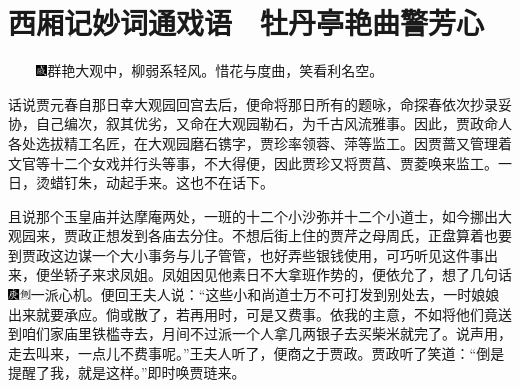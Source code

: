

\chapter{西厢记妙词通戏语　牡丹亭艳曲警芳心}
{　　\includegraphics[width=3mm]{../Images/00005}群艳大观中，柳弱系轻风。惜花与度曲，笑看利名空。}

话说贾元春自那日幸大观园回宫去后，便命将那日所有的题咏，命探春依次抄录妥协，自己编次，叙其优劣，又命在大观园勒石，为千古风流雅事。因此，贾政命人各处选拔精工名匠，在大观园磨石镌字，贾珍率领蓉、萍等监工。因贾蔷又管理着文官等十二个女戏并行头等事，不大得便，因此贾珍又将贾菖、贾菱唤来监工。一日，烫蜡钉朱，动起手来。这也不在话下。

且说那个玉皇庙并达摩庵两处，一班的十二个小沙弥并十二个小道士，如今挪出大观园来，贾政正想发到各庙去分住。不想后街上住的贾芹之母周氏，正盘算着也要到贾政这边谋一个大小事务与儿子管管，也好弄些银钱使用，可巧听见这件事出来，便坐轿子来求凤姐。凤姐因见他素日不大拿班作势的，便依允了，想了几句话{\includegraphics[width=3mm]{../Images/00004}\includegraphics[width=3mm]{../Images/00011}\footnotesize \kaishu 一派心机。}便回王夫人说：``这些小和尚道士万不可打发到别处去，一时娘娘出来就要承应。倘或散了，若再用时，可是又费事。依我的主意，不如将他们竟送到咱们家庙里铁槛寺去，月间不过派一个人拿几两银子去买柴米就完了。说声用，走去叫来，一点儿不费事呢。''王夫人听了，便商之于贾政。贾政听了笑道：``倒是提醒了我，就是这样。''即时唤贾琏来。

